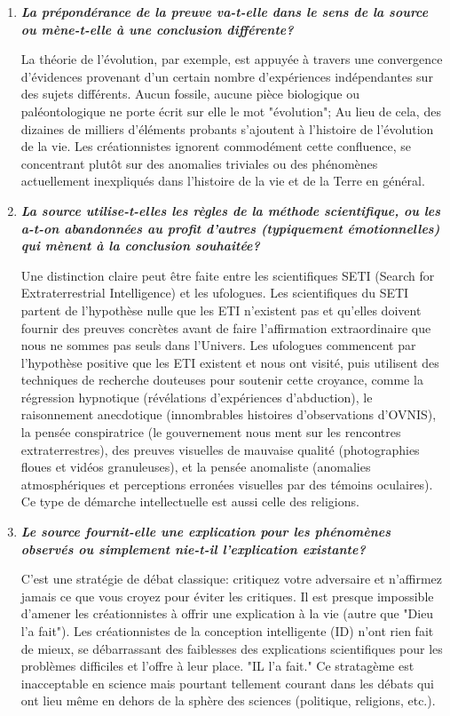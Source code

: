 \begin{enumerate}[label=\protect\circledbullet{\arabic*},leftmargin=15mm]
		\item \textit{\textbf{La pr\'epond\'erance de la preuve va-t-elle dans le sens de la source ou mène-t-elle à une conclusion diff\'erente?}}

		La th\'eorie de l'\'evolution, par exemple, est appuy\'ee à travers une convergence d'\'evidences provenant d'un certain nombre d'exp\'eriences ind\'ependantes sur des sujets diff\'erents. Aucun fossile, aucune pièce biologique ou pal\'eontologique ne porte \'ecrit sur elle le mot "\'evolution"; Au lieu de cela, des dizaines de milliers d'\'el\'ements probants s'ajoutent à l'histoire de l'\'evolution de la vie. Les cr\'eationnistes ignorent commod\'ement cette confluence, se concentrant plutôt sur des anomalies triviales ou des ph\'enomènes actuellement inexpliqu\'es dans l'histoire de la vie et de la Terre en g\'en\'eral.

		\item \textit{\textbf{La source utilise-t-elles les règles de la m\'ethode scientifique, ou les a-t-on abandonn\'ees au profit d'autres (typiquement \'emotionnelles) qui mènent à la conclusion souhait\'ee?}} 

		Une distinction claire peut être faite entre les scientifiques SETI (Search for Extraterrestrial Intelligence) et les ufologues. Les scientifiques du SETI partent de l'hypothèse nulle que les ETI n'existent pas et qu'elles doivent fournir des preuves concrètes avant de faire l'affirmation extraordinaire que nous ne sommes pas seuls dans l'Univers. Les ufologues commencent par l'hypothèse positive que les ETI existent et nous ont visit\'e, puis utilisent des techniques de recherche douteuses pour soutenir cette croyance, comme la r\'egression hypnotique (r\'ev\'elations d'exp\'eriences d'abduction), le raisonnement anecdotique (innombrables histoires d'observations d'OVNIS), la pens\'ee conspiratrice (le gouvernement nous ment sur les rencontres extraterrestres), des preuves visuelles de mauvaise qualit\'e (photographies floues et vid\'eos granuleuses), et la pens\'ee anomaliste (anomalies atmosph\'eriques et perceptions erron\'ees visuelles par des t\'emoins oculaires). Ce type de d\'emarche intellectuelle est aussi celle des religions.

		\item \textit{\textbf{Le source fournit-elle une explication pour les ph\'enomènes observ\'es ou simplement nie-t-il l'explication existante?}}
	
		C'est une strat\'egie de d\'ebat classique: critiquez votre adversaire et n'affirmez jamais ce que vous croyez pour \'eviter les critiques. Il est presque impossible d'amener les cr\'eationnistes à offrir une explication à la vie (autre que "Dieu l'a fait"). Les cr\'eationnistes de la conception intelligente (ID) n'ont rien fait de mieux, se d\'ebarrassant des faiblesses des explications scientifiques pour les problèmes difficiles et l'offre à leur place. "IL l'a fait." Ce stratagème est inacceptable en science mais pourtant tellement courant dans les d\'ebats qui ont lieu même en dehors de la sphère des sciences (politique, religions, etc.).


\end{enumerate}
